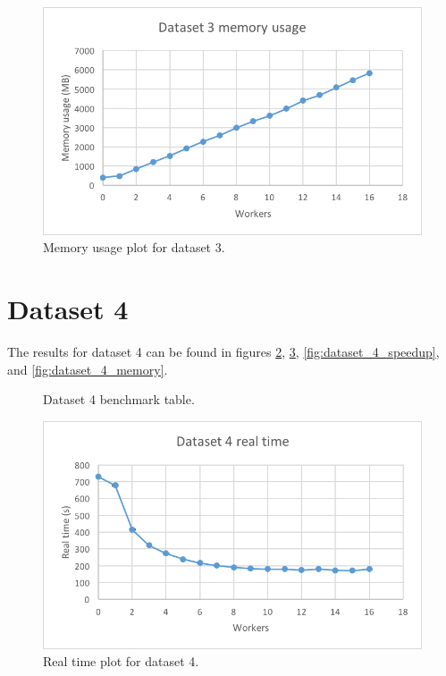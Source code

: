 \begin{figure}[ht]
  \centering
  \includegraphics[width=120mm]{figures/dataset_3/dataset_3_memory.png}
  \caption[Memory usage plot for dataset 3.]{Memory usage plot for dataset 3.}
  \label{fig:dataset_3_memory}
\end{figure}


\section{Dataset 4}
The results for dataset 4 can be found in figures \ref{fig:dataset_4_table}, \ref{fig:dataset_4_real_time}, \ref{fig:dataset_4_speedup}, and \ref{fig:dataset_4_memory}.

\begin{figure}[ht]
\centering
{}
\caption[Dataset 4 benchmark table.]{Dataset 4 benchmark table.}
\label{fig:dataset_4_table}
\end{figure}

\begin{figure}[ht]
  \centering
  \includegraphics[width=120mm]{figures/dataset_4/dataset_4_real_time.png}
  \caption[Real time plot for dataset 4.]{Real time plot for dataset 4.}
  \label{fig:dataset_4_real_time}
\end{figure}

